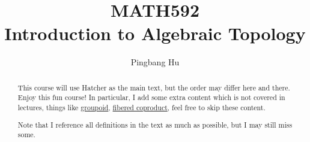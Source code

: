 \documentclass[a4paper]{article}
\author{Pingbang Hu}
\title{MATH592\\Introduction to Algebraic Topology}
\begin{document}
\maketitle

\begin{abstract}
	This course will use Hatcher\cite{hatcher2002algebraic} as the main text, but the order may differ here and there. Enjoy this fun
	course! In particular, I add some extra content which is not covered in lectures, things like \hyperref[def:groupoid]{groupoid}, \hyperref[def:fibered-coproduct]{fibered coproduct},
	feel free to skip these content.

	Note that I reference all definitions in the text as much as possible, but I may still miss some.
\end{abstract}

\tableofcontents


\newpage
\appendix
\appendixpage



\newpage
\printbibliography
\end{document}
